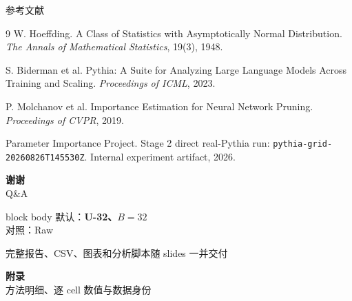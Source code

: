 \documentclass[10pt,aspectratio=169]{beamer}
\newcommand{\best}[1]{\textcolor{secondary}{\textbf{#1}}}
\begin{document}
\begin{frame}{参考文献}
  \footnotesize
  \begin{thebibliography}{9}
      W. Hoeffding.
      \newblock A Class of Statistics with Asymptotically Normal Distribution.
      \newblock \emph{The Annals of Mathematical Statistics}, 19(3), 1948.

      S. Biderman et al.
      \newblock Pythia: A Suite for Analyzing Large Language Models Across Training and Scaling.
      \newblock \emph{Proceedings of ICML}, 2023.

      P. Molchanov et al.
      \newblock Importance Estimation for Neural Network Pruning.
      \newblock \emph{Proceedings of CVPR}, 2019.

      Parameter Importance Project.
      \newblock Stage 2 direct real-Pythia run:
      \texttt{pythia-grid-20260826T145530Z}.
      \newblock Internal experiment artifact, 2026.
  \end{thebibliography}
\end{frame}

\begin{frame}[plain]
  \vfill
  \centering
  {\color{white}\Huge\bfseries 谢谢}\\[5mm]
  {\color{white!85}\Large Q\&A}\\[13mm]
  \begin{beamercolorbox}[rounded=true,sep=.8em,wd=.62\textwidth]{block body}
    \centering
    默认：\best{U-32、$B=32$}\\
    对照：Raw
  \end{beamercolorbox}
  \vfill
  {\color{white!65}\small 完整报告、CSV、图表和分析脚本随 slides 一并交付}
\end{frame}

\appendix

\begin{frame}[plain]
  \vfill
  \centering
  {\color{white}\Huge\bfseries 附录}\\[3mm]
  {\color{white!70}\large 方法明细、逐 cell 数值与数据身份}
  \vfill
\end{frame}
\end{document}
